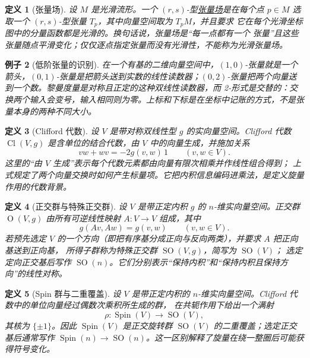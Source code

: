 \documentclass[UTF8,fontset=none,a4paper,11pt]{ctexart}
\theoremstyle{foundation-definition}
\newtheorem{definition}{定义}[section]
\theoremstyle{foundation-theorem}
\theoremstyle{foundation-proposition}
\theoremstyle{foundation-example}
\newtheorem{example}[definition]{例子}
\theoremstyle{foundation-remark}
\theoremstyle{foundation-theorem}
\newcommand{\term}[2]{\hyperref[#1]{#2}}
\begin{document}
\begin{definition}[张量场]\label{def:tensor-field}
设 \(M\) 是光滑流形。一个 \((r,s)\)-型\term{def:tensor-field}{张量场}是在每个点
\(p\in M\) 选取一个 \((r,s)\)-型张量 \(T_p\)，其中向量空间取为 \(T_pM\)，并且要求
它在每个光滑坐标图中的分量函数都是光滑的。换句话说，张量场是“每一点都有一个
张量”且这些张量随点平滑变化；仅仅逐点指定张量而没有光滑性，不能称为光滑张量场。
\end{definition}

\begin{example}[低阶张量的识别]
在一个有基的二维向量空间中，\((1,0)\)-张量就是一个箭头，\((0,1)\)-张量是把箭头送到实数的线性读数器；\((0,2)\)-张量把两个向量送到一个数。黎曼度量是对称且正定的这种双线性读数器，而 2-形式是交替的：交换两个输入会变号，输入相同则为零。上标和下标是在坐标中记账的方式，不是张量本身的两种不同大小。
\end{example}

\begin{definition}[Clifford 代数]\label{def:clifford-algebra}
设 \(V\) 是带对称双线性型 \(g\) 的实向量空间。Clifford 代数
\(\operatorname{Cl}(V,g)\) 是含单位的结合代数，由 \(V\) 中的向量生成，并施加关系
\[
vw+wv=-2g(v,w)\,1\qquad(v,w\in V).
\]
这里的“由 \(V\) 生成”表示每个代数元素都由向量有限次相乘并作线性组合得到；
上式规定了两个向量交换时如何产生标量项。它把内积信息编码进乘法，是定义旋量作用的代数背景。
\end{definition}

\begin{definition}[正交群与特殊正交群]\label{def:orthogonal-special-orthogonal}
设 \(V\) 是带正定内积 \(g\) 的 \(n\)-维实向量空间。正交群
\(\operatorname{O}(V,g)\) 由所有可逆线性映射 \(A:V\to V\) 组成，其中
\[
g(Av,Aw)=g(v,w)\qquad(v,w\in V).
\]
若预先选定 \(V\) 的一个方向（即把有序基分成正向与反向两类），并要求 \(A\) 把正向基送到正向基，
所得子群称为特殊正交群 \(\operatorname{SO}(V,g)\)，简写为 \(\operatorname{SO}(V)\)；
选定定向正交基后写作 \(\operatorname{SO}(n)\)。它们分别表示“保持内积”和“保持内积且保持方向”的线性对称。
\end{definition}

\begin{definition}[Spin 群与二重覆盖]\label{def:spin-group}
设 \(V\) 是带正定内积的 \(n\)-维实向量空间。Clifford 代数中的单位向量经过偶数次乘积所生成的群，
在共轭作用下给出一个满射
\[
\rho:\operatorname{Spin}(V)\longrightarrow \operatorname{SO}(V),
\]
其核为 \(\{\pm1\}\)。因此 \(\operatorname{Spin}(V)\) 是正交旋转群
\(\operatorname{SO}(V)\) 的二重覆盖；选定正交基后通常写作
\(\operatorname{Spin}(n)\to\operatorname{SO}(n)\)。这一区别解释了旋量在绕一整圈后可能获得符号变化。
\end{definition}
\end{document}
